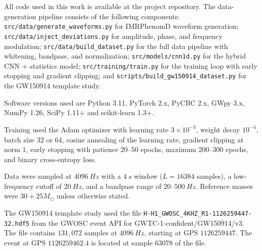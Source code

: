 All code used in this work is available at the project repository.
The data-generation pipeline consists of the following components:
\texttt{src/data/generate\_waveforms.py} for IMRPhenomD waveform
generation; \texttt{src/data/inject\_deviations.py} for amplitude,
phase, and frequency modulation; \texttt{src/data/build\_dataset.py}
for the full data pipeline with whitening, bandpass, and
normalization; \texttt{src/models/cnn1d.py} for the hybrid CNN +
statistics model; \texttt{src/training/train.py} for the training
loop with early stopping and gradient clipping; and
\texttt{scripts/build\_gw150914\_dataset.py} for the GW150914
template study.

Software versions used are Python 3.11, PyTorch 2.x, PyCBC 2.x,
GWpy 3.x, NumPy 1.26, SciPy 1.11+ and scikit-learn 1.3+.

Training used the Adam optimizer with learning rate $3 \times 10^{-3}$,
weight decay $10^{-4}$, batch size $32$ or $64$, cosine annealing of
the learning rate, gradient clipping at norm $1$, early stopping
with patience $20$--$50$ epochs, maximum $200$--$300$ epochs, and
binary cross-entropy loss.

Data were sampled at $\SI{4096}{Hz}$ with a $\SI{4}{s}$ window
($L = 16384$ samples), a low-frequency cutoff of $\SI{20}{Hz}$, and
a bandpass range of $20$--$\SI{500}{Hz}$. Reference masses were
$30 + 25 M_\odot$ unless otherwise stated.

The GW150914 template study used the file
\texttt{H-H1\_GWOSC\_4KHZ\_R1-1126259447-32.hdf5} from the GWOSC
event API for GWTC-1-confident/GW150914/v3. The file contains
$131{,}072$ samples at $\SI{4096}{Hz}$, starting at GPS
$1126259447$. The event at GPS $1126259462.4$ is located at sample
$63078$ of the file.
